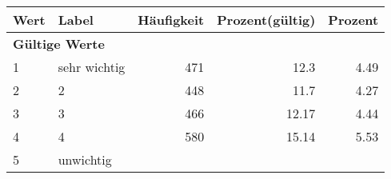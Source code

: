      \begin{longtable}{lXrrr}
     \toprule
     \textbf{Wert} & \textbf{Label} & \textbf{Häufigkeit} & \textbf{Prozent(gültig)} & \textbf{Prozent} \\
     \endhead
     \midrule
     \multicolumn{5}{l}{\textbf{Gültige Werte}}\\

     1 &
     \multicolumn{1}{X}{ sehr wichtig   } &


       \num{471} &
       \num[round-mode=places,round-precision=2]{12,3} &
         \num[round-mode=places,round-precision=2]{4,49} \\

     2 &
     \multicolumn{1}{X}{ 2   } &


       \num{448} &
       \num[round-mode=places,round-precision=2]{11,7} &
         \num[round-mode=places,round-precision=2]{4,27} \\

     3 &
     \multicolumn{1}{X}{ 3   } &


       \num{466} &
       \num[round-mode=places,round-precision=2]{12,17} &
         \num[round-mode=places,round-precision=2]{4,44} \\

     4 &
     \multicolumn{1}{X}{ 4   } &


       \num{580} &
       \num[round-mode=places,round-precision=2]{15,14} &
         \num[round-mode=places,round-precision=2]{5,53} \\

     5 &
     \multicolumn{1}{X}{ unwichtig   } &



\end{longtable}

